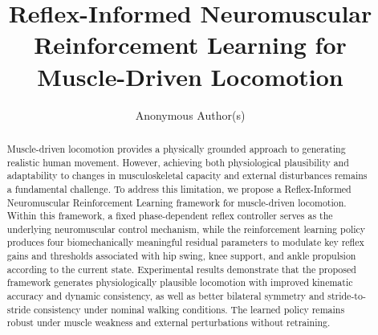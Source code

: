 \documentclass[acmtog,review,anonymous]{acmart}
\begin{document}
\title{
Reflex-Informed Neuromuscular Reinforcement Learning for Muscle-Driven Locomotion
}
\author{Anonymous Author(s)}
\renewcommand{\shortauthors}{anon.}

\begin{abstract}

Muscle-driven locomotion provides a physically grounded approach to generating realistic human movement. However, achieving both physiological plausibility and adaptability to changes in musculoskeletal capacity and external disturbances remains a fundamental challenge. To address this limitation, we propose a Reflex-Informed Neuromuscular Reinforcement Learning framework for muscle-driven locomotion. Within this framework, a fixed phase-dependent reflex controller serves as the underlying neuromuscular control mechanism, while the reinforcement learning policy produces four biomechanically meaningful residual parameters to modulate key reflex gains and thresholds associated with hip swing, knee support, and ankle propulsion according to the current state. Experimental results demonstrate that the proposed framework generates physiologically plausible locomotion with improved kinematic accuracy and dynamic consistency, as well as better bilateral symmetry and stride-to-stride consistency under nominal walking conditions. The learned policy remains robust under muscle weakness and external perturbations without retraining.

\end{abstract}
\end{document}
